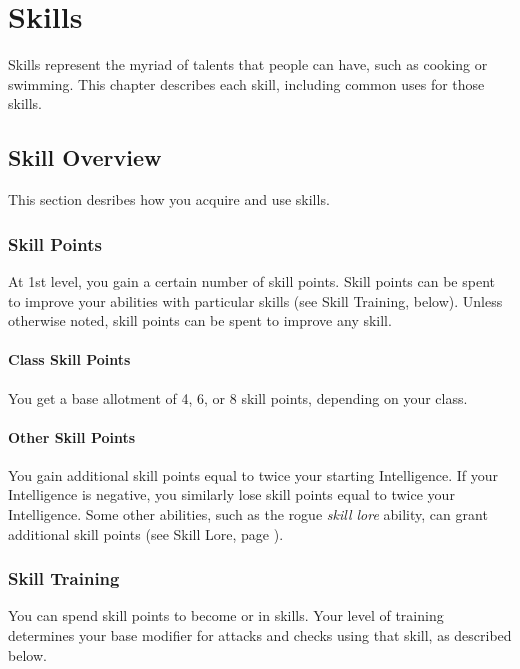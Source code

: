 \chapter{Skills}\label{Skills}

Skills represent the myriad of talents that people can have, such as cooking or swimming.
This chapter describes each skill, including common uses for those skills.

\section{Skill Overview}

    This section desribes how you acquire and use skills.

    \subsection{Skill Points}\label{Skill Points}

        At 1st level, you gain a certain number of skill points.
        Skill points can be spent to improve your abilities with particular skills (see Skill Training, below).
        Unless otherwise noted, skill points can be spent to improve any skill.

        \subsubsection{Class Skill Points}

            You get a base allotment of 4, 6, or 8 skill points, depending on your class.

        \subsubsection{Other Skill Points}

            You gain additional skill points equal to twice your starting Intelligence.
            If your Intelligence is negative, you similarly lose skill points equal to twice your Intelligence.
            Some other abilities, such as the rogue \textit{skill lore} ability, can grant additional skill points (see Skill Lore, page ).

    \subsection{Skill Training}\label{Skill Training}

        You can spend skill points to become  or  in skills.
        Your level of training determines your base modifier for attacks and checks using that skill, as described below.

